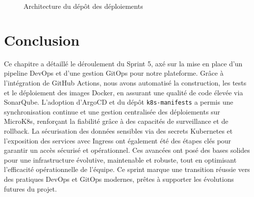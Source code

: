 \begin{figure}[h]
    \begin{adjustwidth}{-3.5cm}{-3.5cm}
    \centering
    \caption{Architecture du dépôt des déploiements}
    \label{fig:argo5}
    \end{adjustwidth}
\end{figure}
\clearpage
\section{Conclusion}

Ce chapitre a détaillé le déroulement du Sprint 5, axé sur la mise en place d’un pipeline DevOps et d’une gestion GitOps pour notre plateforme. Grâce à l’intégration de GitHub Actions, nous avons automatisé la construction, les tests et le déploiement des images Docker, en assurant une qualité de code élevée via SonarQube. L’adoption d’ArgoCD et du dépôt \texttt{k8s-manifests} a permis une synchronisation continue et une gestion centralisée des déploiements sur MicroK8s, renforçant la fiabilité grâce à des capacités de surveillance et de rollback. La sécurisation des données sensibles via des secrets Kubernetes et l’exposition des services avec Ingress ont également été des étapes clés pour garantir un accès sécurisé et opérationnel. Ces avancées ont posé des bases solides pour une infrastructure évolutive, maintenable et robuste, tout en optimisant l’efficacité opérationnelle de l’équipe. Ce sprint marque une transition réussie vers des pratiques DevOps et GitOps modernes, prêtes à supporter les évolutions futures du projet.